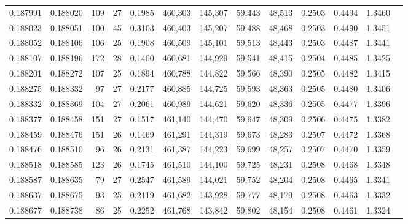 \begin{tabular}{rrrrrrrrrrrrr}
0.187991 & 0.188020 & 109 &  27 &                                     0.1985 & 460,303 & 145,307 &  59,443 &  48,513 & 0.2503 & 0.4494 & 1.3460 \\
0.188023 & 0.188051 & 100 &  45 &                                     0.3103 & 460,403 & 145,207 &  59,488 &  48,468 & 0.2503 & 0.4490 & 1.3451 \\
0.188052 & 0.188106 & 106 &  25 &                                     0.1908 & 460,509 & 145,101 &  59,513 &  48,443 & 0.2503 & 0.4487 & 1.3441 \\
0.188107 & 0.188196 & 172 &  28 &                                     0.1400 & 460,681 & 144,929 &  59,541 &  48,415 & 0.2504 & 0.4485 & 1.3425 \\
0.188201 & 0.188272 & 107 &  25 &                                     0.1894 & 460,788 & 144,822 &  59,566 &  48,390 & 0.2505 & 0.4482 & 1.3415 \\
0.188275 & 0.188332 &  97 &  27 &                                     0.2177 & 460,885 & 144,725 &  59,593 &  48,363 & 0.2505 & 0.4480 & 1.3406 \\
0.188332 & 0.188369 & 104 &  27 &                                     0.2061 & 460,989 & 144,621 &  59,620 &  48,336 & 0.2505 & 0.4477 & 1.3396 \\
0.188377 & 0.188458 & 151 &  27 &                                     0.1517 & 461,140 & 144,470 &  59,647 &  48,309 & 0.2506 & 0.4475 & 1.3382 \\
0.188459 & 0.188476 & 151 &  26 &                                     0.1469 & 461,291 & 144,319 &  59,673 &  48,283 & 0.2507 & 0.4472 & 1.3368 \\
0.188476 & 0.188510 &  96 &  26 &                                     0.2131 & 461,387 & 144,223 &  59,699 &  48,257 & 0.2507 & 0.4470 & 1.3359 \\
0.188518 & 0.188585 & 123 &  26 &                                     0.1745 & 461,510 & 144,100 &  59,725 &  48,231 & 0.2508 & 0.4468 & 1.3348 \\
0.188587 & 0.188635 &  79 &  27 &                                     0.2547 & 461,589 & 144,021 &  59,752 &  48,204 & 0.2508 & 0.4465 & 1.3341 \\
0.188637 & 0.188675 &  93 &  25 &                                     0.2119 & 461,682 & 143,928 &  59,777 &  48,179 & 0.2508 & 0.4463 & 1.3332 \\
0.188677 & 0.188738 &  86 &  25 &                                     0.2252 & 461,768 & 143,842 &  59,802 &  48,154 & 0.2508 & 0.4461 & 1.3324 \\

\end{tabular}
